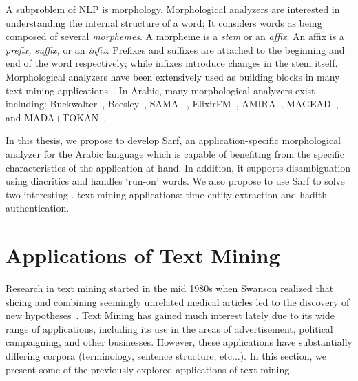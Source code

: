 \documentclass[a4,12pt]{report}
\begin{document}
A subproblem of NLP is morphology.
Morphological analyzers%
are interested in understanding the internal structure of a word;
It considers words as being composed of 
several {\em morphemes}. 
A morpheme is a {\em stem} or an {\em affix}.
An affix is a {\em prefix, suffix,} or an {\em infix}.
Prefixes and suffixes are attached to the beginning and end of the word respectively; 
while infixes introduce changes in the stem itself. 
Morphological analyzers have been extensively used as building blocks 
in many text mining applications~\cite{Sou07}.  In Arabic, many morphological analyzers exist including:  
Buckwalter~\cite{Buckwalter:02},
Beesley~\cite{Beesley:01},
SAMA ~\cite{Kulick:10},
ElixirFM~\cite{Otakar:07}, 
AMIRA~\cite{Diab:07,Benajiba:07},
MAGEAD~\cite{Habash:05}, 
and MADA+TOKAN~\cite{Habash:09}.

In this thesis, we propose to develop Sarf, an application-specific 
morphological analyzer for the Arabic language 
which is capable of benefiting
from the specific characteristics of the application at hand. 
In addition, it supports disambiguation using diacritics and 
handles `run-on' words. We also propose to use Sarf to solve two interesting .
text mining applications: time entity extraction and hadith authentication.

\section{Applications of Text Mining}
\label{sec:Applications}

%

Research in text mining started in the mid 1980s when Swanson 
realized that slicing and combining seemingly unrelated medical 
articles led to the discovery of new 
hypotheses~\cite{JNi06}. 
Text Mining has gained much interest lately due to its wide range of applications,
including its use in the areas of advertisement, 
political campaigning, and other businesses.
However, these applications have substantially differing corpora (terminology, 
sentence structure, etc...). In this section, we present some of the 
previously explored applications of text mining.
\end{document}
